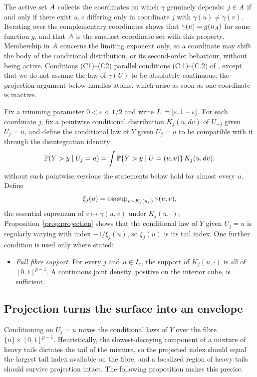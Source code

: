 The active set $A$ collects the coordinates on which $\gamma$
genuinely depends: $j\in A$ if and only if there exist $u,v$ differing
only in coordinate $j$ with $\gamma(u)\ne\gamma(v)$. Iterating over the
complementary coordinates shows that $\gamma(u)=g(u_{A})$ for some
function $g$, and that $A$ is the smallest coordinate set with this
property. Membership in $A$ concerns the limiting exponent
only, so a coordinate may shift the body of the conditional distribution, or
its second-order behaviour, without being active. Conditions (C1)--(C2)
parallel conditions (C.1)--(C.2) of \citet{gardesPodgorny2025}, except that
we do not assume the law of $\gamma(U)$ to be absolutely continuous; the
projection argument below handles atoms, which arise as soon as one
coordinate is inactive.

Fix a trimming parameter $0<\varepsilon<1/2$ and write
$I_\varepsilon=[\varepsilon,1-\varepsilon]$. For each coordinate $j$, fix a
pointwise conditional distribution $K_j(u,dv)$ of $U_{-j}$ given
$U_j=u$, and define the conditional law of $Y$ given $U_j=u$ to be
compatible with it through the disintegration identity
\[
 \mathbb P(Y>y\mid U_j=u)=\int\mathbb P\{Y>y\mid U=(u,v)\}\,K_j(u,dv);
\]
without such pointwise versions the statements below hold for almost
every $u$. Define
\[
 \xi_j(u)=\operatorname*{ess\,sup}\nolimits_{v\sim K_j(u,\cdot)}\gamma(u,v),
\]
the essential supremum of $v\mapsto\gamma(u,v)$ under $K_j(u,\cdot)$;
Proposition~\ref{prop:projection} shows that the conditional law of $Y$
given $U_j=u$ is regularly varying with index $-1/\xi_j(u)$, so
$\xi_j(u)$ is its tail index. One further condition is used only where
stated:

\begin{itemize}
\item[(S)] \emph{Full fibre support.} For every $j$ and $u\in I_\varepsilon$, the
support of $K_j(u,\cdot)$ is all of $[0,1]^{p-1}$. A continuous joint
density, positive on the interior cube, is sufficient.
\end{itemize}

\subsection{Projection turns the surface into an envelope}

Conditioning on $U_j=u$ mixes the conditional laws of $Y$ over the
fibre $\{u\}\times[0,1]^{p-1}$. Heuristically, the slowest-decaying
component of a mixture of heavy tails dictates the tail of the mixture,
so the projected index should equal the largest tail index available on
the fibre, and a localized region of heavy tails should survive
projection intact. The following proposition makes this precise.

